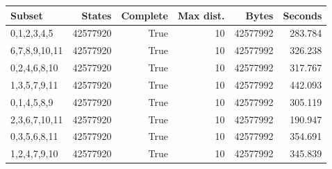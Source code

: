 {\small
\begin{tabular}{lrrrrr}
\hline
Subset & States & Complete & Max dist. & Bytes & Seconds \\
\hline
0,1,2,3,4,5 & 42577920 & True & 10 & 42577992 & 283.784 \\
6,7,8,9,10,11 & 42577920 & True & 10 & 42577992 & 326.238 \\
0,2,4,6,8,10 & 42577920 & True & 10 & 42577992 & 317.767 \\
1,3,5,7,9,11 & 42577920 & True & 10 & 42577992 & 442.093 \\
0,1,4,5,8,9 & 42577920 & True & 10 & 42577992 & 305.119 \\
2,3,6,7,10,11 & 42577920 & True & 10 & 42577992 & 190.947 \\
0,3,5,6,8,11 & 42577920 & True & 10 & 42577992 & 354.691 \\
1,2,4,7,9,10 & 42577920 & True & 10 & 42577992 & 345.839 \\
\hline
\end{tabular}
}
